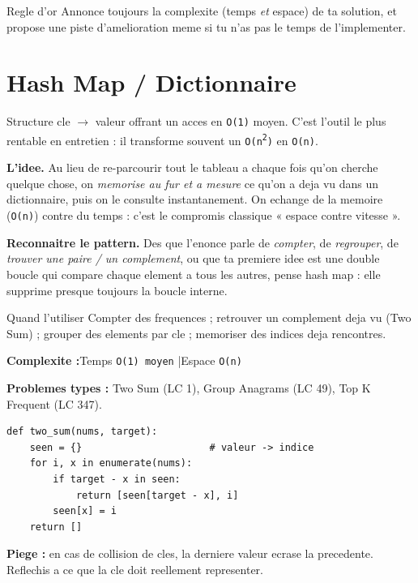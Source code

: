 \documentclass[11pt,a4paper]{article}
\newcommand{\complexite}[2]{%
  \noindent\textbf{Complexite :}\quad Temps \texttt{#1} \quad|\quad Espace \texttt{#2}\par\smallskip}
\newcommand{\leetcode}[1]{\noindent\textbf{Problemes types :} #1\par\medskip}
\begin{document}
\begin{infobox}{Regle d'or}
Annonce toujours la complexite (temps \emph{et} espace) de ta solution, et
propose une piste d'amelioration meme si tu n'as pas le temps de l'implementer.
\end{infobox}

\newpage
\section{Hash Map / Dictionnaire}
Structure cle $\rightarrow$ valeur offrant un acces en \texttt{O(1)} moyen.
C'est l'outil le plus rentable en entretien : il transforme souvent un
\texttt{O(n\textsuperscript{2})} en \texttt{O(n)}.

\textbf{L'idee.} Au lieu de re-parcourir tout le tableau a chaque fois qu'on
cherche quelque chose, on \emph{memorise au fur et a mesure} ce qu'on a deja vu
dans un dictionnaire, puis on le consulte instantanement. On echange de la
memoire (\texttt{O(n)}) contre du temps : c'est le compromis classique
« espace contre vitesse ».

\textbf{Reconnaitre le pattern.} Des que l'enonce parle de \emph{compter}, de
\emph{regrouper}, de \emph{trouver une paire / un complement}, ou que ta premiere
idee est une double boucle qui compare chaque element a tous les autres, pense
hash map : elle supprime presque toujours la boucle interne.

\begin{infobox}{Quand l'utiliser}
Compter des frequences ; retrouver un complement deja vu (Two Sum) ; grouper
des elements par cle ; memoriser des indices deja rencontres.
\end{infobox}

\complexite{O(1) moyen}{O(n)}
\leetcode{Two Sum (LC 1), Group Anagrams (LC 49), Top K Frequent (LC 347).}

\begin{lstlisting}
def two_sum(nums, target):
    seen = {}                      # valeur -> indice
    for i, x in enumerate(nums):
        if target - x in seen:
            return [seen[target - x], i]
        seen[x] = i
    return []
\end{lstlisting}

\textbf{Piege :} en cas de collision de cles, la derniere valeur ecrase la
precedente. Reflechis a ce que la cle doit reellement representer.
\end{document}
